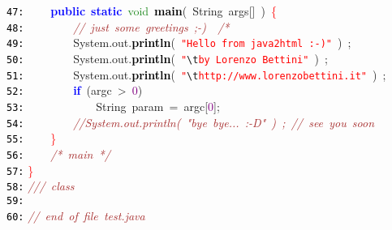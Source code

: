 \documentclass{article}
\begin{document}
\mbox{}\texttt{\textcolor{Black}{47:}} \ \ \ \ \textbf{\textcolor{Blue}{public}}\ \textbf{\textcolor{Blue}{static}}\ \textcolor{ForestGreen}{void}\ \textbf{\textcolor{Black}{main}}\textcolor{BrickRed}{(}\ \textcolor{TealBlue}{String}\ args\textcolor{BrickRed}{[]}\ \textcolor{BrickRed}{)}\ \textcolor{Red}{\{} \\
\mbox{}\texttt{\textcolor{Black}{48:}} \ \ \ \ \ \ \ \ \textit{\textcolor{Brown}{//\ just\ some\ greetings\ ;-)\ \ /*}} \\
\mbox{}\texttt{\textcolor{Black}{49:}} \ \ \ \ \ \ \ \ System\textcolor{BrickRed}{.}out\textcolor{BrickRed}{.}\textbf{\textcolor{Black}{println}}\textcolor{BrickRed}{(}\ \texttt{\textcolor{Red}{"{}Hello\ from\ java2html\ :-)"{}}}\ \textcolor{BrickRed}{)}\ \textcolor{BrickRed}{;} \\
\mbox{}\texttt{\textcolor{Black}{50:}} \ \ \ \ \ \ \ \ System\textcolor{BrickRed}{.}out\textcolor{BrickRed}{.}\textbf{\textcolor{Black}{println}}\textcolor{BrickRed}{(}\ \texttt{\textcolor{Red}{"{}}}\texttt{\textcolor{CarnationPink}{\textbackslash{}t}}\texttt{\textcolor{Red}{by\ Lorenzo\ Bettini"{}}}\ \textcolor{BrickRed}{)}\ \textcolor{BrickRed}{;} \\
\mbox{}\texttt{\textcolor{Black}{51:}} \ \ \ \ \ \ \ \ System\textcolor{BrickRed}{.}out\textcolor{BrickRed}{.}\textbf{\textcolor{Black}{println}}\textcolor{BrickRed}{(}\ \texttt{\textcolor{Red}{"{}}}\texttt{\textcolor{CarnationPink}{\textbackslash{}t}}\texttt{\textcolor{Red}{http://www.lorenzobettini.it"{}}}\ \textcolor{BrickRed}{)}\ \textcolor{BrickRed}{;} \\
\mbox{}\texttt{\textcolor{Black}{52:}} \ \ \ \ \ \ \ \ \textbf{\textcolor{Blue}{if}}\ \textcolor{BrickRed}{(}argc\ \textcolor{BrickRed}{\textgreater{}}\ \textcolor{Purple}{0}\textcolor{BrickRed}{)} \\
\mbox{}\texttt{\textcolor{Black}{53:}} \ \ \ \ \ \ \ \ \ \ \ \ \textcolor{TealBlue}{String}\ param\ \textcolor{BrickRed}{=}\ argc\textcolor{BrickRed}{[}\textcolor{Purple}{0}\textcolor{BrickRed}{];} \\
\mbox{}\texttt{\textcolor{Black}{54:}} \ \ \ \ \ \ \ \ \textit{\textcolor{Brown}{//System.out.println(\ "{}bye\ bye...\ :-D"{}\ )\ ;\ //\ see\ you\ soon}} \\
\mbox{}\texttt{\textcolor{Black}{55:}} \ \ \ \ \textcolor{Red}{\}} \\
\mbox{}\texttt{\textcolor{Black}{56:}} \ \ \ \ \textit{\textcolor{Brown}{/*\ main\ */}} \\
\mbox{}\texttt{\textcolor{Black}{57:}} \textcolor{Red}{\}} \\
\mbox{}\texttt{\textcolor{Black}{58:}} \textit{\textcolor{Brown}{///\ class}} \\
\mbox{}\texttt{\textcolor{Black}{59:}}  \\
\mbox{}\texttt{\textcolor{Black}{60:}} \textit{\textcolor{Brown}{//\ end\ of\ file\ test.java}}
\end{document}
